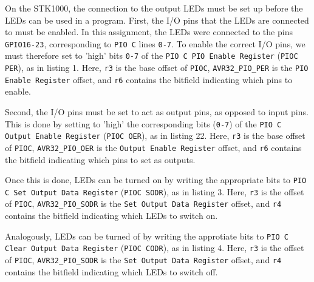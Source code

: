 On the STK1000, the connection to the output LEDs must be set up before the LEDs can be used in a program.
First, the I/O pins that the LEDs are connected to must be enabled.
In this assignment, the LEDs were connected to the pins \texttt{GPIO16-23}, corresponding to \texttt{PIO C} lines \texttt{0-7}.
To enable the correct I/O pins, we must therefore set to 'high' bits \texttt{0-7} of the \texttt{PIO C PIO Enable Register} (\texttt{PIOC PER}), as in listing 1.
Here, \texttt{r3} is the base offset of \texttt{PIOC}, \texttt{AVR32\_PIO\_PER} is the \texttt{PIO Enable Register} offset, and \texttt{r6} contains the bitfield indicating which pins to enable.


Second, the I/O pins must be set to act as output pins, as opposed to input pins.
This is done by setting to 'high' the corresponding bits (\texttt{0-7}) of the \texttt{PIO C Output Enable Register} (\texttt{PIOC OER}), as in listing 22.
Here, \texttt{r3} is the base offset of \texttt{PIOC}, \texttt{AVR32\_PIO\_OER} is the \texttt{Output Enable Register} offset, and \texttt{r6} contains the bitfield indicating which pins to set as outputs.


Once this is done, LEDs can be turned on by writing the appropriate bits to \texttt{PIO C Set Output Data Register} (\texttt{PIOC SODR}), as in listing 3.
Here, \texttt{r3} is the offset of \texttt{PIOC}, \texttt{AVR32\_PIO\_SODR} is the \texttt{Set Output Data Register} offset, and \texttt{r4} contains the bitfield indicating which LEDs to switch on.


Analogously, LEDs can be turned of by writing the approtiate bits to \texttt{PIO C Clear Output Data Register} (\texttt{PIOC CODR}), as in listing 4. 
Here, \texttt{r3} is the offset of \texttt{PIOC}, \texttt{AVR32\_PIO\_SODR} is the \texttt{Set Output Data Register} offset, and \texttt{r4} contains the bitfield indicating which LEDs to switch off.

